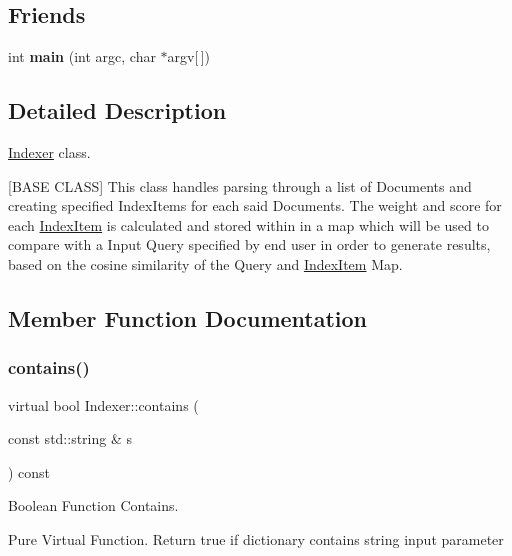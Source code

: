 \subsection*{Friends}
\begin{DoxyCompactItemize}
\item 
\mbox{\label{class_indexer_a0ddf1224851353fc92bfbff6f499fa97}} 
int {\bfseries main} (int argc, char $\ast$argv\mbox{[}$\,$\mbox{]})
\end{DoxyCompactItemize}


\subsection{Detailed Description}
\hyperlink{class_indexer}{Indexer} class. 

\mbox{[}B\+A\+SE C\+L\+A\+SS\mbox{]} This class handles parsing through a list of Documents and creating specified Index\+Items for each said Documents. The weight and score for each \hyperlink{class_index_item}{Index\+Item} is calculated and stored within in a map which will be used to compare with a Input Query specified by end user in order to generate results, based on the cosine similarity of the Query and \hyperlink{class_index_item}{Index\+Item} Map. 

\subsection{Member Function Documentation}
\mbox{\label{class_indexer_abb847ff86be1ec9265fb53a5ac6f7008}} 
\subsubsection{\texorpdfstring{contains()}{contains()}}
{\footnotesize\ttfamily virtual bool Indexer\+::contains (\begin{DoxyParamCaption}\item[{const std\+::string \&}]{s }\end{DoxyParamCaption}) const\hspace{0.3cm}{\ttfamily [pure virtual]}}



Boolean Function Contains. 

Pure Virtual Function. Return true if dictionary contains string input parameter 

